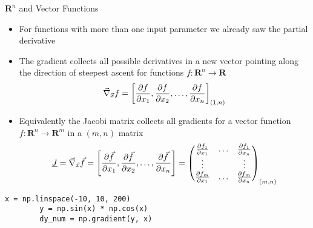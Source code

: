   \begin{frame}[fragile]{$\mathbf{R}^n$ and Vector Functions}
    \begin{itemize}
      \item For functions with more than one input parameter we already saw the partial derivative
      \item The gradient collects all possible derivatives in a new vector pointing along the direction of steepest ascent for functions $f:\mathbf{R}^n\rightarrow \mathbf{R}$
      \begin{equation*}
        \vec{\nabla}_{\vec{x}} f = \left[
          \frac{\partial f}{\partial x_1}, \frac{\partial f}{\partial x_2}, \dots, \frac{\partial f}{\partial x_n} \right]_{(1, n)}
      \end{equation*}
      \item Equivalently the Jacobi matrix collects all gradients for a vector function $f:\mathbf{R}^n\rightarrow\mathbf{R}^m$ in a $(m, n)$ matrix
      \begin{equation*}
        \underline{J} = \vec{\nabla}_{\vec{x}} \vec{f} = \left[
          \frac{\partial \vec{f}}{\partial x_1}, \frac{\partial \vec{f}}{\partial x_2}, \dots, \frac{\partial \vec{f}}{\partial x_n} \right] =
          \begin{pmatrix}
            \frac{\partial f_1}{\partial x_1} & \dots & \frac{\partial f_1}{\partial x_n} \\
            \vdots & & \vdots \\
            \frac{\partial f_m}{\partial x_1} & \dots & \frac{\partial f_m}{\partial x_n}
          \end{pmatrix}_{(m, n)}
      \end{equation*}
    \end{itemize}
    \begin{mdframed}
      \begin{lstlisting}[style=dark, gobble=8, title=\lsttitlelight{Checking gradients numerically}]
        x = np.linspace(-10, 10, 200)
        y = np.sin(x) * np.cos(x)
        dy_num = np.gradient(y, x)
      \end{lstlisting}
    \end{mdframed}
  \end{frame}

